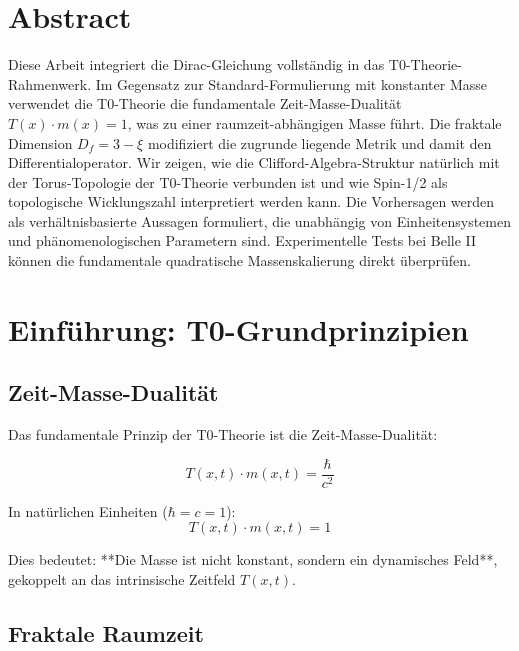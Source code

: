 \section*{Abstract}
		Diese Arbeit integriert die Dirac-Gleichung vollständig in das T0-Theorie-Rahmenwerk. 
		Im Gegensatz zur Standard-Formulierung mit konstanter Masse verwendet die T0-Theorie 
		die fundamentale Zeit-Masse-Dualität $T(x) \cdot m(x) = 1$, was zu einer 
		raumzeit-abhängigen Masse führt. Die fraktale Dimension $D_f = 3 - \xi$ modifiziert 
		die zugrunde liegende Metrik und damit den Differentialoperator. Wir zeigen, wie 
		die Clifford-Algebra-Struktur natürlich mit der Torus-Topologie der T0-Theorie 
		verbunden ist und wie Spin-1/2 als topologische Wicklungszahl interpretiert werden 
		kann. Die Vorhersagen werden als verhältnisbasierte Aussagen formuliert, die 
		unabhängig von Einheitensystemen und phänomenologischen Parametern sind. 
		Experimentelle Tests bei Belle II können die fundamentale quadratische 
		Massenskalierung direkt überprüfen.

	
	
	\section{Einführung: T0-Grundprinzipien}
	
	\subsection{Zeit-Masse-Dualität}
	
	Das fundamentale Prinzip der T0-Theorie ist die Zeit-Masse-Dualität:
	
	\begin{equation}
		T(x,t) \cdot m(x,t) = \frac{\hbar}{c^2}
		\label{eq:time_mass_duality}
	\end{equation}
	
	In natürlichen Einheiten ($\hbar = c = 1$):
	\begin{equation}
		T(x,t) \cdot m(x,t) = 1
		\label{eq:tmd_natural}
	\end{equation}
	
	Dies bedeutet: **Die Masse ist nicht konstant, sondern ein dynamisches Feld**, 
	gekoppelt an das intrinsische Zeitfeld $T(x,t)$.
	
	\subsection{Fraktale Raumzeit}
	
